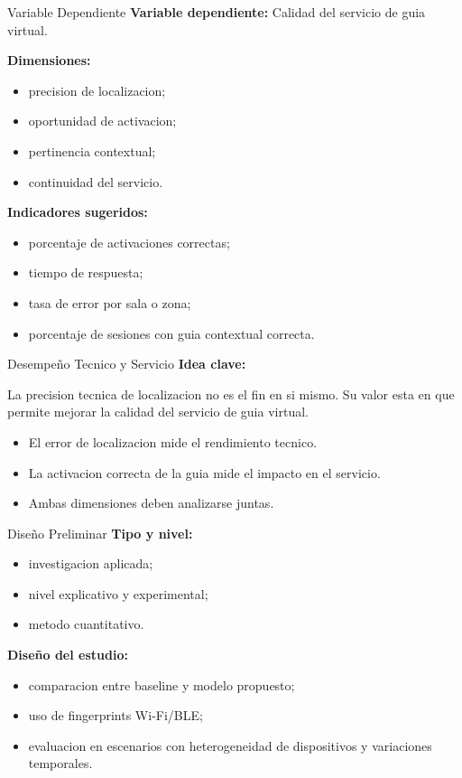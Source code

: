 \documentclass[aspectratio=169,11pt]{beamer}
\begin{document}
\begin{frame}{Variable Dependiente}
\justifying
\textbf{Variable dependiente:} Calidad del servicio de guia virtual.

\vspace{0.6em}

\textbf{Dimensiones:}
\begin{itemize}
  \item precision de localizacion;
  \item oportunidad de activacion;
  \item pertinencia contextual;
  \item continuidad del servicio.
\end{itemize}

\textbf{Indicadores sugeridos:}
\begin{itemize}
  \item porcentaje de activaciones correctas;
  \item tiempo de respuesta;
  \item tasa de error por sala o zona;
  \item porcentaje de sesiones con guia contextual correcta.
\end{itemize}
\end{frame}

\begin{frame}{Desempeño Tecnico y Servicio}
\justifying
\textbf{Idea clave:}

La precision tecnica de localizacion no es el fin en si mismo. Su valor esta en que permite mejorar la calidad del servicio de guia virtual.

\vspace{0.7em}

\begin{itemize}
  \item El error de localizacion mide el rendimiento tecnico.
  \item La activacion correcta de la guia mide el impacto en el servicio.
  \item Ambas dimensiones deben analizarse juntas.
\end{itemize}
\end{frame}

\begin{frame}{Diseño Preliminar}
\justifying
\textbf{Tipo y nivel:}
\begin{itemize}
  \item investigacion aplicada;
  \item nivel explicativo y experimental;
  \item metodo cuantitativo.
\end{itemize}

\vspace{0.6em}

\textbf{Diseño del estudio:}
\begin{itemize}
  \item comparacion entre baseline y modelo propuesto;
  \item uso de fingerprints Wi-Fi/BLE;
  \item evaluacion en escenarios con heterogeneidad de dispositivos y variaciones temporales.
\end{itemize}
\end{frame}
\end{document}
